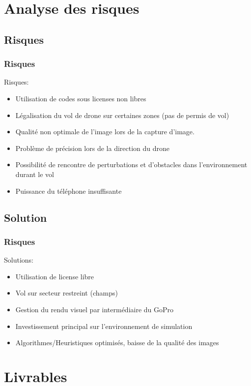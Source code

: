 \documentclass[transparent]{beamer}
\begin{document}
\section{Analyse des risques}
\subsection{Risques}
\begin{frame}
\frametitle{Risques}
	\begin{block}{Risques:}
		\begin{itemize}
			\item Utilisation de codes sous licenses non libres
			\item Légalisation du vol de drone sur certaines zones (pas de permis de vol)
			\item Qualité non optimale de l'image lors de la capture d'image.
			\item Problème de précision lors de la direction du drone
			\item Possibilité de rencontre de perturbations et d'obstacles dans l'environnement durant le vol
			\item Puissance du téléphone insuffisante
		\end{itemize}
	\end{block}
\end{frame}
\subsection{Solution}
\begin{frame}
\frametitle{Risques}
	\begin{block}{Solutions:}
		\begin{itemize}
			\item Utilisation de license libre
			\item Vol sur secteur restreint (champs)
			\item Gestion du rendu visuel par intermédiaire du GoPro
			\item Investissement principal sur l'environnement de simulation
			\item Algorithmes/Heuristiques optimisés, baisse de la qualité des images
		\end{itemize}
	\end{block}
\end{frame}

\section{Livrables}
\end{document}
